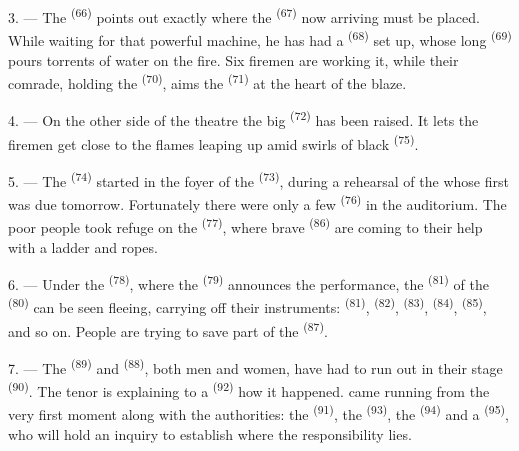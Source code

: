 3. --- The  \textsuperscript{(66)} points out exactly where the
 \textsuperscript{(67)} now arriving must be placed. While waiting
for that powerful machine, he has had a  \textsuperscript{(68)} set up,
whose long  \textsuperscript{(69)} pours torrents of water on the fire. Six
firemen are working it, while their comrade, holding the
 \textsuperscript{(70)}, aims the  \textsuperscript{(71)} at the heart
of the blaze.

4. --- On the other side of the theatre the big  \textsuperscript{(72)} has
been raised. It lets the firemen get close to the flames leaping up amid swirls of black
 \textsuperscript{(75)}.

\VUsaut{5.0mm}
\VUsaut{3.4mm}

5. --- The  \textsuperscript{(74)} started in the foyer of the
 \textsuperscript{(73)}, during a rehearsal of the  whose
first  was due tomorrow. Fortunately there were only a few
 \textsuperscript{(76)} in the auditorium. The poor people took refuge on
the  \textsuperscript{(77)}, where brave
 \textsuperscript{(86)} are coming to their help with a ladder and
ropes.

6. --- Under the  \textsuperscript{(78)}, where the 
\textsuperscript{(79)} announces the performance, the 
\textsuperscript{(81)} of the  \textsuperscript{(80)} can be seen fleeing,
carrying off their instruments:  \textsuperscript{(81)}, 
\textsuperscript{(82)},  \textsuperscript{(83)}, 
\textsuperscript{(84)},
 \textsuperscript{(85)}, and so on. People are trying to save part
of the  \textsuperscript{(87)}.

7. --- The  \textsuperscript{(89)} and 
\textsuperscript{(88)},
 both men and women, have had to run out in their stage
 \textsuperscript{(90)}. The tenor is explaining to a
 \textsuperscript{(92)} how it happened.  came
running from the very first moment along with the authorities: the
 \textsuperscript{(91)}, the  \textsuperscript{(93)}, the
 \textsuperscript{(94)} and a 
\textsuperscript{(95)}, who will hold an inquiry to establish where the responsibility lies.
\VUsaut{6.0mm}
\VUfilet{22mm}
